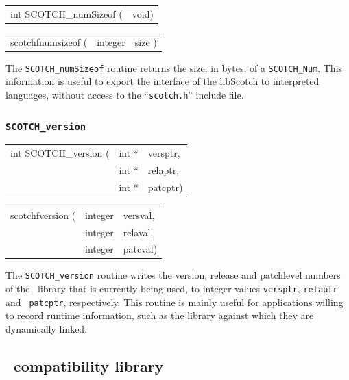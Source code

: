 \begin{itemize}
\progsyn

{\tt\begin{tabular}{l@{}l}
int SCOTCH\_numSizeof ( & void)
\end{tabular}}

{\tt\begin{tabular}{l@{}ll}
scotchfnumsizeof ( & integer & size )
\end{tabular}}

\progdes

The {\tt SCOTCH\_numSizeof} routine returns the size, in bytes, of a
{\tt SCOTCH\_\lbt Num}. This information is useful to export the
interface of the {\sc libScotch} to interpreted languages, without
access to the ``{\tt scotch.h}'' include file.
\end{itemize}

\subsubsection{{\tt SCOTCH\_version}}

\begin{itemize}
\progsyn

{\tt\begin{tabular}{l@{}ll}
int SCOTCH\_version ( & int * & versptr, \\
                      & int * & relaptr, \\
                      & int * & patcptr)
\end{tabular}}

{\tt\begin{tabular}{l@{}ll}
scotchfversion ( & integer & versval, \\
                 & integer & relaval, \\
                 & integer & patcval)
\end{tabular}}

\progdes

The {\tt SCOTCH\_version} routine writes the version, release and
patchlevel numbers of the \scotch\ library that is currently being
used, to integer values {\tt *versptr}, {\tt *relaptr} and {\tt
patcptr}, respectively. This routine is mainly useful for applications
willing to record runtime information, such as the library against
which they are dynamically linked.
\end{itemize}

\subsection{\metis\ compatibility library}
\label{sec-lib-metis}

